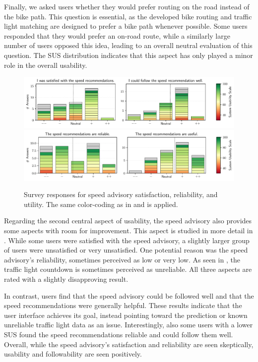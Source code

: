 Finally, we asked users whether they would prefer routing on the road instead of the bike path. This question is essential, as the developed bike routing and traffic light matching are designed to prefer a bike path whenever possible. Some users responded that they would prefer an on-road route, while a similarly large number of users opposed this idea, leading to an overall neutral evaluation of this question. The SUS distribution indicates that this aspect has only played a minor role in the overall usability.

\begin{figure}[t]
\caption{Survey responses for speed advisory satisfaction, reliability, and utility. The same color-coding as in  and  is applied.}\label{fig:speed-recommendations-satisfaction}
\includegraphics[width=\linewidth]{images/app-usability-questions-speed-recommendations-satisfaction.pdf}
\\
\includegraphics[width=\linewidth]{images/app-usability-questions-speed-recommendations-reliability.pdf}
\end{figure}

Regarding the second central aspect of usability, the speed advisory also provides some aspects with room for improvement. This aspect is studied in more detail in . While some users were satisfied with the speed advisory, a slightly larger group of users were unsatisfied or very unsatisfied. One potential reason was the speed advisory's reliability, sometimes perceived as low or very low. As seen in  , the traffic light countdown is sometimes perceived as unreliable. All three aspects are rated with a slightly disapproving result.

In contrast, users find that the speed advisory could be followed well and that the speed recommendations were generally helpful. These results indicate that the user interface achieves its goal, instead pointing toward the prediction or known unreliable traffic light data as an issue. Interestingly, also some users with a lower SUS found the speed recommendations reliable and could follow them well. Overall, while the speed advisory's satisfaction and reliability are seen skeptically, usability and followability are seen positively.

